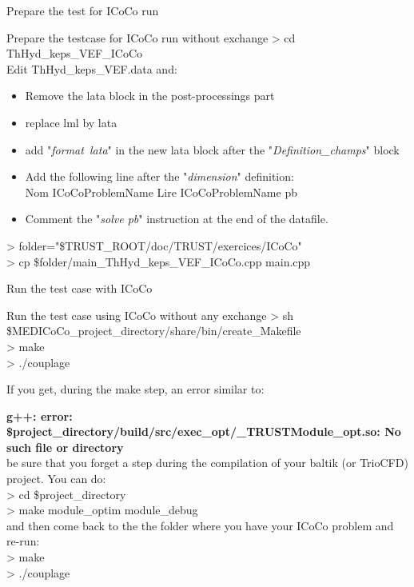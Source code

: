 \documentclass[10pt, hyperref={unicode=true,pdfusetitle, bookmarks=true,bookmarksnumbered=false,bookmarksopen=false, breaklinks=false,pdfborder={0 0 1},backref=true,colorlinks=true,linkcolor=darkblue,pageanchor, urlcolor=darkblue}]{beamer}
\begin{document}
\begin{frame}{Prepare the test for ICoCo run}

\begin{block}{Prepare the testcase for ICoCo run without exchange}
> cd ThHyd\_keps\_VEF\_ICoCo \\
Edit ThHyd\_keps\_VEF.data and:
\begin{itemize}
\item Remove the lata block in the post-processings part
\item replace lml by lata
\item add "\textit{format\ lata}" in the new lata block after the  "\textit{Definition\_champs}" block\\
\item Add the following line after the "\textit{dimension}" definition:\\
Nom ICoCoProblemName Lire ICoCoProblemName pb
\item Comment the "\textit{solve pb}" instruction at the end of the datafile.
\end{itemize}

> folder="\$TRUST\_ROOT/doc/TRUST/exercices/ICoCo"\\
> cp \$folder/main\_ThHyd\_keps\_VEF\_ICoCo.cpp main.cpp
\end{block}

\end{frame}
\begin{frame}{Run the test case with ICoCo}


\begin{block}{Run the test case using ICoCo without any exchange}
> sh \$MEDICoCo\_project\_directory/share/bin/create\_Makefile\\
> make \\
> ./couplage
\end{block}

\begin{block}{If you get, during the make step, an error similar to:}

\textbf{g++: error: \$project\_directory/build/src/exec\_opt/\_TRUSTModule\_opt.so: No such file or directory} \\

be sure that you forget a step during the compilation of your baltik (or TrioCFD) project. You can do:\\
> cd \$project\_directory\\
> make module\_optim module\_debug \\
and then come back to the the folder where you have your ICoCo problem and re-run: \\
> make \\
> ./couplage
\end{block}

\end{frame}
\end{document}
